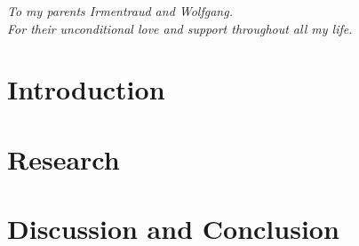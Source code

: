 \documentclass[oneside]{book}
\begin{document}

\clearpage
\begin{center}
    \thispagestyle{empty}
    \vspace*{\fill}
    \textit{To my parents Irmentraud and Wolfgang. \\ For their unconditional love and support throughout all my life.}
    \vspace*{\fill}
\end{center}

\clearpage


\epigraphhead[450]{}
\part{Introduction}
\label{part:introduction}




\epigraphhead[450]{}
\part{Research}
\label{part:research}





\epigraphhead[450]{}
\part{Discussion and Conclusion}
\label{part:discussion}




\renewcommand\bibname{References}




\end{document}
